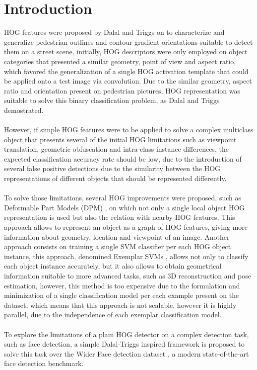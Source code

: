 \documentclass[10pt,twocolumn,letterpaper]{article}
\begin{document}
\section{Introduction}
HOG features were proposed by Dalal and Triggs on \cite{1467360} to characterize and generalize pedestrian outlines and contour gradient orientations suitable to detect them on a street scene, initially, HOG descriptors were only employed on object categories that presented a similar geometry, point of view and aspect ratio, which favored the generalization of a single HOG activation template that could be applied onto a test image via convolution. Due to the similar geometry, aspect ratio and orientation present on pedestrian pictures, HOG representation was suitable to solve this binary classification problem, as Dalal and Triggs demostrated.
\\
\\
However, if simple HOG features were to be applied to solve a complex multiclass object that presents several of the initial HOG limitations such as viewpoint translation, geometric obfuscation and intra-class instance differences, the expected classification accuracy rate should be low, due to the introduction of several false positive detections due to the similarity between the HOG representations of different objects that should be represented differently. 
\\
\\
To solve those limitations, several HOG improvements were proposed, such as Deformable Part Models (DPM) \cite{felzenszwalb2010object}, on which not only a single local object HOG representation is used but also the relation with nearby HOG features. This approach allows to represent an object as a graph of HOG features, giving more information about geometry, location and viewpoint of an image. Another approach consists on training a single SVM classifier per each HOG object instance, this approach, denomined Exemplar SVMs \cite{malisiewicz2011ensemble}, allows not only to classify each object instance accurately, but it also allows to obtain geometrical information suitable to more advanced tasks, such as 3D reconstruction and pose estimation, however, this method is too expensive due to the formulation and minimization of a single classification model per each example present on the dataset, which means that this approach is not scalable, however it is highly parallel, due to the independence of each exemplar classification model. 
\\
\\
To explore the limitations of a plain HOG detector on a complex detection task, such as face detection, a simple Dalal-Triggs inspired framework is proposed to solve this task over the Wider Face detection dataset \cite{yang2016wider}, a modern state-of-the-art face detection benchmark.
\end{document}
